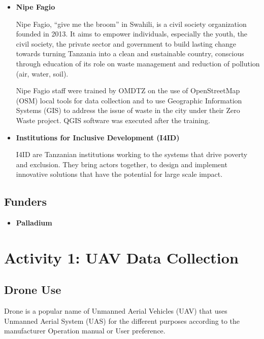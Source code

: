 \documentclass[a4paper,12pt,twoside]{article}
\begin{document}
    \begin{itemize}
        \item \textbf{Nipe Fagio}
    
        Nipe Fagio, “give me the broom” in Swahili, is a civil society organization founded in 2013. It aims to empower individuals, especially the youth, the civil society, the private sector and government to build lasting change towards turning Tanzania into a clean and sustainable country, conscious through education of its role on waste management and reduction of pollution (air, water, soil).
    
        Nipe Fagio staff were trained by OMDTZ on the use of OpenStreetMap (OSM) local tools for data collection and to use Geographic Information Systems (GIS) to address the issue of waste in the city under their Zero Waste project. QGIS software was executed after the training.

        \item \textbf{Institutions for Inclusive Development (I4ID)}
    
        I4ID are Tanzanian institutions working to the systems that drive poverty and exclusion. They bring actors together, to design and implement innovative solutions that have the potential for large scale impact.
    
    \end{itemize}

\subsection{Funders}

    \begin{itemize}
        \item \textbf{Palladium}
    
        \lipsum[0-1]
    
    \end{itemize}   

\section{Activity 1: UAV Data Collection}

\subsection{Drone Use}

    Drone is a popular name of Unmanned Aerial Vehicles (UAV) that uses Unmanned Aerial System (UAS) for the different purposes according to the manufacturer Operation manual or User preference. 
\end{document}
